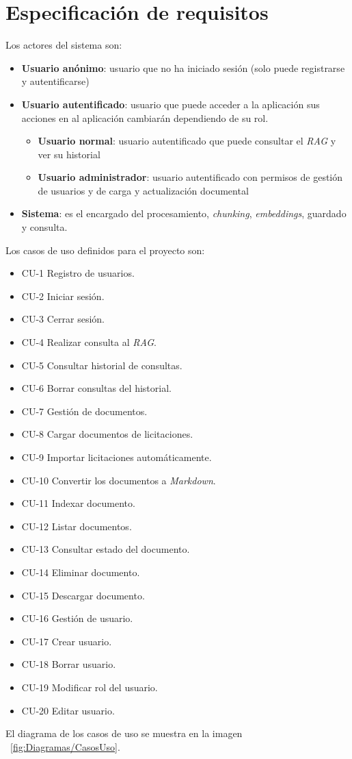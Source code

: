 \section{Especificación de requisitos}

Los actores del sistema son:
\begin{itemize}
\tightlist
	\item \textbf{Usuario anónimo}: usuario que no ha iniciado sesión (solo puede registrarse y autentificarse)
	\item \textbf{Usuario autentificado}: usuario que puede acceder a la aplicación sus acciones en al aplicación cambiarán dependiendo de su rol. 
	\begin{itemize}
	\tightlist
	 	\item \textbf{Usuario normal}: usuario autentificado que puede consultar el \textit{RAG} y ver su historial
	 	\item \textbf{Usuario administrador}: usuario autentificado con permisos de gestión de usuarios y de carga y actualización documental
	 \end{itemize}
	 \item \textbf{Sistema}: es el encargado del procesamiento, \textit{chunking}, \textit{embeddings}, guardado y consulta. 
\end{itemize}

Los casos de uso definidos para el proyecto son:
\begin{itemize}
\tightlist
	\item CU-1 Registro de usuarios.
	\item CU-2 Iniciar sesión.
	\item CU-3 Cerrar sesión.
	\item CU-4 Realizar consulta al \textit{RAG}.
	\item CU-5 Consultar historial de consultas.
	\item CU-6 Borrar consultas del historial.
	\item CU-7 Gestión de documentos.
	\item CU-8 Cargar documentos de licitaciones.
	\item CU-9 Importar licitaciones automáticamente.
	\item CU-10 Convertir los documentos a \textit{Markdown}.
	\item CU-11 Indexar documento.
	\item CU-12 Listar documentos.
	\item CU-13 Consultar estado del documento.
	\item CU-14 Eliminar documento.
	\item CU-15 Descargar documento.
	\item CU-16 Gestión de usuario.
	\item CU-17 Crear usuario.
	\item CU-18 Borrar usuario.
	\item CU-19 Modificar rol del usuario.
	\item CU-20 Editar usuario.
\end{itemize}
El diagrama de los casos de uso se muestra en la imagen ~\ref{fig:Diagramas/CasosUso}.

